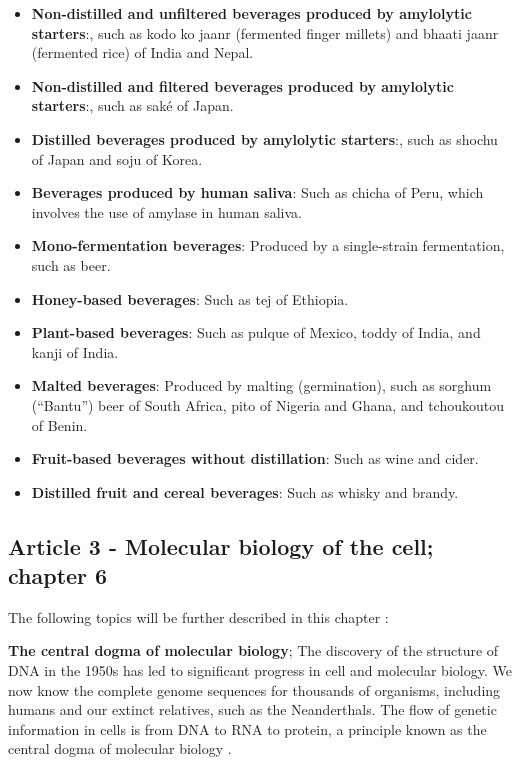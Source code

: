 \begin{itemize}
    \item \textbf{Non-distilled and unfiltered beverages produced by amylolytic starters}:, such as kodo ko jaanr (fermented finger millets) and bhaati jaanr (fermented rice) of India and Nepal.
    \item \textbf{Non-distilled and filtered beverages produced by amylolytic starters}:, such as saké of Japan.
    \item \textbf{Distilled beverages produced by amylolytic starters}:, such as shochu of Japan and soju of Korea.
    \item \textbf{Beverages produced by human saliva}: Such as chicha of Peru, which involves the use of amylase in human saliva.
    \item \textbf{Mono-fermentation beverages}: Produced by a single-strain fermentation, such as beer.
    \item \textbf{Honey-based beverages}: Such as tej of Ethiopia.
    \item \textbf{Plant-based beverages}: Such as pulque of Mexico, toddy of India, and kanji of India.
    \item \textbf{Malted beverages}: Produced by malting (germination), such as sorghum (“Bantu”) beer of South Africa, pito of Nigeria and Ghana, and tchoukoutou of Benin.
    \item \textbf{Fruit-based beverages without distillation}: Such as wine and cider.
    \item \textbf{Distilled fruit and cereal beverages}: Such as whisky and brandy.
\end{itemize}

\subsection{Article 3 - Molecular biology of the cell; chapter 6}

The following topics will be further described in this chapter \cite*{L1-Chapter6}:

\textbf{The central dogma of molecular biology};
The discovery of the structure of DNA in the 1950s has led to significant progress in cell and molecular biology. We now know the complete genome sequences for thousands of organisms, including humans and our extinct relatives, such as the Neanderthals. The flow of genetic information in cells is from DNA to RNA to protein, a principle known as the central dogma of molecular biology \cite*{L1-Chapter6}.

